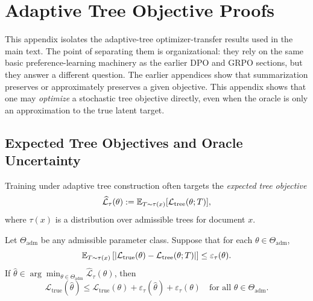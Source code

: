 \section{Adaptive Tree Objective Proofs}
\label{app:adaptive-tree-proofs}

This appendix isolates the adaptive-tree optimizer-transfer results used in the
main text. The point of separating them is organizational: they rely on the
same basic preference-learning machinery as the earlier DPO and GRPO sections,
but they answer a different question. The earlier appendices show that
summarization preserves or approximately preserves a given objective. This
appendix shows that one may \emph{optimize} a stochastic tree objective
directly, even when the oracle is only an approximation to the true latent
target.

\subsection{Expected Tree Objectives and Oracle Uncertainty}

Training under adaptive tree construction often targets the \emph{expected tree
objective}
\[
\widehat{\mathcal{L}}_{\tau}(\theta)
:=
\mathbb{E}_{T \sim \tau(x)}[\mathcal{L}_{\mathrm{tree}}(\theta;T)],
\]
where $\tau(x)$ is a distribution over admissible trees for document $x$.

\begin{theorem}
\label{thm:app-expected-tree-transfer}
Let $\Theta_{\mathrm{adm}}$ be any admissible parameter class. Suppose that for
each $\theta \in \Theta_{\mathrm{adm}}$,
\[
\mathbb{E}_{T \sim \tau(x)}
\left[
  \left|
    \mathcal{L}_{\mathrm{true}}(\theta) -
    \mathcal{L}_{\mathrm{tree}}(\theta;T)
  \right|
\right]
\le \varepsilon_{\tau}(\theta).
\]
If $\widehat{\theta} \in \arg\min_{\theta \in \Theta_{\mathrm{adm}}}
\widehat{\mathcal{L}}_{\tau}(\theta)$, then
\[
\mathcal{L}_{\mathrm{true}}(\widehat{\theta})
\le
\mathcal{L}_{\mathrm{true}}(\theta)
  + \varepsilon_{\tau}(\widehat{\theta})
  + \varepsilon_{\tau}(\theta)
\quad
\text{for all } \theta \in \Theta_{\mathrm{adm}}.
\]
\end{theorem}

